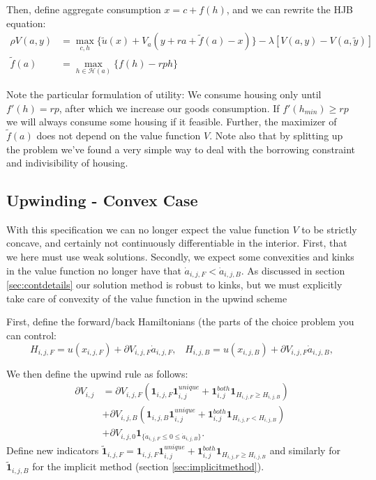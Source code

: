 \documentclass[12pt]{article}
\DeclareMathOperator{\1}{\mathbbm{1}}
\begin{document}
Then, define aggregate consumption $x=c+f(h)$, and we can rewrite the HJB equation:
\begin{align*}
\rho V(a,y) &= \max_{c,h} \big \{ \tilde u (x) + V_a (y + ra + \tilde f(a) - x)  \big \} - \lambda [V(a,y) - V(a,\tilde y)] \\
\tilde f (a) &= \max_{h\in \mathcal{H}(a)} \big \{ f(h) - rph \}
\end{align*}

Note the particular formulation of utility: We consume housing only until $f'(h)=rp$, after which we increase our goods consumption. If $f'(h_{min})\ge rp$ we will always consume some housing if it feasible. Further, the maximizer of $\tilde f(a)$ does not depend on the value function $V$. Note also that by splitting up the problem we've found a very simple way to deal with the borrowing constraint and indivisibility of housing.

\subsection{Upwinding - Convex Case}
With this specification we can no longer expect the value function $V$ to be strictly concave, and certainly not continuously differentiable in the interior. First, that we here must use weak solutions. Secondly, we expect some convexities and kinks in the value function no longer have that $\dot a_{i,j,F}<\dot a_{i,j,B}$.  As discussed in section \ref{sec:contdetails} our solution method is robust to kinks, but we must explicitly take care of convexity of the value function in the upwind scheme

First, define the forward/back Hamiltonians (the parts of the choice problem you can control:
\begin{equation}
H_{i,j,F}=u(x_{i,j,F}) + \partial V_{i,j,F} \dot a_{i,j,F}, \;\;\; H_{i,j,B}=u(x_{i,j,B}) + \partial V_{i,j,F} \dot a_{i,j,B},
\end{equation}

We then define the upwind rule as follows:
\begin{equation}
\begin{split}
\partial V_{i,j} & =  
\partial V_{i,j,F}\left(\mathbf{1}_{i,j,F} \mathbf{1}^{unique}_{i,j} + \mathbf{1}_{i,j}^{both}\mathbf{1}_{H_{i,j,F}\ge H_{i,j,B}}\right)  \\ 
 &+ \partial V_{i,j,B}\left(\mathbf{1}_{i,j,B} \mathbf{1}^{unique}_{i,j} + \mathbf{1}_{i,j}^{both}\mathbf{1}_{H_{i,j,F}<H_{i,j,B}}\right) \\
 &+ \partial V_{i,j,0} \mathbf{1}_{\{\dot a_{i,j,F}\le 0 \le \dot a_{i,j,B}\}}.
\end{split}
\end{equation}
Define new indicators $\tilde {\mathbf{1}}_{i,j,F} =\mathbf{1}_{i,j,F} \mathbf{1}^{unique}_{i,j} + \mathbf{1}_{i,j}^{both}\mathbf{1}_{H_{i,j,F}\ge H_{i,j,B}} $ and similarly for $\tilde {\mathbf{1}}_{i,j,B}$ for the implicit method (section \ref{sec:implicitmethod}).
\end{document}
